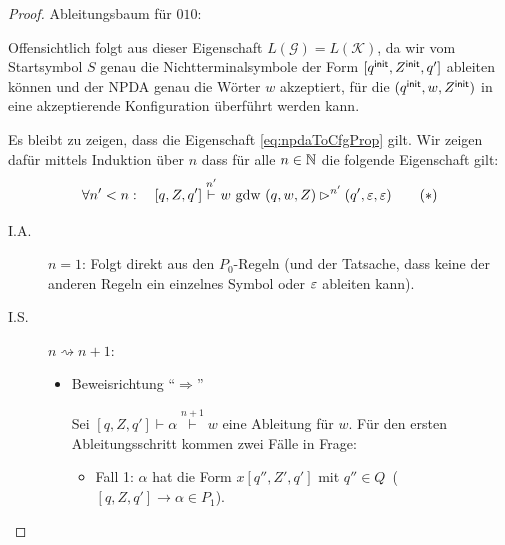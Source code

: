 \begin{proof}
    Ableitungsbaum für $010$:
    
    \begin{center}
    \vspace*{-\baselineskip}
    \end{center}
    
    Offensichtlich folgt aus dieser Eigenschaft $L(\mathcal{G}) = L(\mathcal{K})$, da wir vom Startsymbol $S$ genau die Nichtterminalsymbole der Form
    $[q^\mathsf{init}, Z^\mathsf{init}, q']$ ableiten können und der \ac{NPDA} genau die Wörter $w$ akzeptiert, für die  $(q^\mathsf{init}, w, Z^\mathsf{init})$ in eine akzeptierende Konfiguration überführt werden kann.
    
    Es bleibt zu zeigen, dass die Eigenschaft \eqref{eq:npdaToCfgProp} gilt.
    Wir zeigen dafür mittels Induktion über $n$ dass für alle $n\in\mathbb{N}$ die folgende Eigenschaft gilt:
	\begin{equation*}
        \forall n'< n:\quad [q,Z,q']\stackrel{n'}{\vdash} w \text{ gdw } (q,w,Z) \rhd^{n'} (q',\varepsilon,\varepsilon) \tag{$*$}
	\end{equation*}
    
    \begin{description}
    
    	\item[I.A.] $n=1$: Folgt direkt aus den $P_0$-Regeln (und der Tatsache, dass keine der anderen Regeln ein einzelnes Symbol oder $\varepsilon$ ableiten kann).
    	\item[I.S.] $n\rightsquigarrow n+1$:
    	\begin{itemize}
    	 \item Beweisrichtung "`$\Rightarrow$"'
    	 
    	 Sei $[q,Z,q']\vdash\alpha\stackrel{n+1}{\vdash} w$ eine Ableitung für $w$. Für den ersten Ableitungsschritt kommen zwei Fälle in Frage:
      \begin{itemize}
      \item Fall 1: $\alpha$ hat die Form $x[q'', Z', q']$ mit $q'' \in Q$\  ($[q,Z,q']\rightarrow\alpha \in P_1$).
      

\end{itemize}
\end{itemize}
\end{description}
\end{proof}
